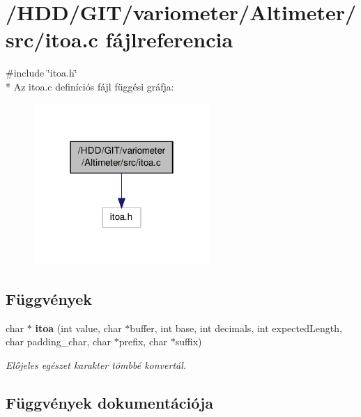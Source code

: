 \section{/\-H\-D\-D/\-G\-I\-T/variometer/\-Altimeter/src/itoa.c fájlreferencia}
\label{itoa_8c}
{\ttfamily \#include \char`\"{}itoa.\-h\char`\"{}}\\*
Az itoa.\-c definíciós fájl függési gráfja\-:
\nopagebreak
\begin{figure}[H]
\begin{center}
\leavevmode
\includegraphics[width=190pt]{itoa_8c__incl}
\end{center}
\end{figure}
\subsection*{Függvények}
\begin{DoxyCompactItemize}
\item 
char $\ast$ {\bf itoa} (int value, char $\ast$buffer, int base, int decimals, int expected\-Length, char padding\-\_\-char, char $\ast$prefix, char $\ast$suffix)
\begin{DoxyCompactList}\small\item\em Előjeles egészet karakter tömbbé konvertál. \end{DoxyCompactList}\end{DoxyCompactItemize}


\subsection{Függvények dokumentációja}
